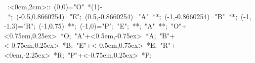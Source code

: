 %


\hbox{
\xy    <2cm,0cm>:<0cm,2cm>::
       (0,0)="O" *\ellipse(1){-} *{\bullet};
       (-0.5,0.8660254)="E"; (0.5,-0.8660254)="A" **\dir{-};
       (-1,-0.8660254)="B" **\dir{-}; 
       (-1,-1.3)="R"; (-1,0.75) **\dir{-}; 
       (-1,0)="P"; "E"; **\dir{-}; "A" **\dir{-};
       "O"+<0.75em,0.25ex> *{O};
       "A"+<0.5em,-0.75ex> *{A};
       "B"+<-0.75em,0.25ex> *{B};
       "E"+<-0.5em,0.75ex> *{E};
       "R"+<0em,-2.25ex> *{R};
       "P"+<-0.75em,0.25ex> *{P};
\endxy}

